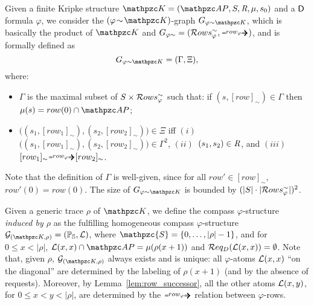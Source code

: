 Given a finite Kripke structure $\Ku=\KuDef$ and a $\mathsf{D}$ formula $\varphi$, we consider the $(\varphi\!\sim\!\Ku)$-graph $G_{\varphi \sim\Ku}$, which is basically the product of $\Ku$ and $G_{\varphi \sim}=(\Rows^\sim,\rownext)$, and is formally defined as 
\[G_{\varphi \sim\Ku}=(\Gamma, \Xi),\] where:
\begin{itemize}
    \item $\Gamma$ is the maximal subset of $S\times \mathcal{R} ows_{\varphi}^\sim$ such that: if $(s,[row]_\sim)\in\Gamma$ then $\mu(s)=row(0)\cap\AP$;
    \item $\big((s_1,[row_1]_\sim), (s_2,[row_2]_\sim)\big)\in\Xi$ iff $(i)$~$\big((s_1,[row_1]_\sim), (s_2,[row_2]_\sim)\big)\in\Gamma^2$, $(ii)$~$(s_1,s_2)\in\textit{R}$, and $(iii)$ $[row_1]_\sim\rownext [row_2]_\sim$.
\end{itemize}
Note that the definition of $\Gamma$ is well-given, since for all $row'\in[row]_\sim$, $row'(0)=row(0)$. The size of $G_{\varphi\sim\Ku}$ is bounded by $(|S|\cdot |\mathcal{R} ows_{\varphi}^\sim|)^2$.

Given a generic trace $\rho$ of $\Ku$, we define the compass $\varphi$-structure \emph{induced by $\rho$} as the fulfilling homogeneous  compass $\varphi$-structure $\cG_{(\Ku,\rho)}=(\bbP_\bbD, \cL)$, where $\mathpzc{S}=\{0,\ldots, |\rho|-1\}$, and for $0\leq x<|\rho|$, $\cL(x,x)\cap\AP=\mu(\rho(x+1))$ and $\mathcal{R} eq_D(\mathcal{L}(x,x))=\emptyset$. 
Note that, given $\rho$, $\cG_{(\Ku,\rho)}$ always exists and is unique: all $\varphi$-atoms $\mathcal{L}(x,x)$ ``on the diagonal'' are determined by the labeling of $\rho(x+1)$ (and by the absence of requests). Moreover,
by Lemma~\ref{lem:row_successor}, all the other atoms $\mathcal{L}(x,y)$, for $0\leq x<y<|\rho|$, are determined by the $\rownext$ relation between $\varphi$-rows. 

